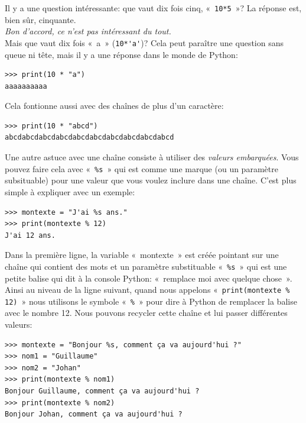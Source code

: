 Il y a une question intéressante: que vaut dix fois cinq, «~\verb+10*5+~»? La réponse est, bien sûr, cinquante.\\
  
  \emph{Bon d'accord, ce n'est pas intéressant du tout.}\\

Mais que vaut dix fois «~a~» (\verb+10*'a'+)? Cela peut paraître une question sans queue ni tête, mais il y a une réponse dans le monde de Python:

\begin{Verbatim}[frame=single,rulecolor=\color{mbleu}, label=à taper]
>>> print(10 * "a")
aaaaaaaaaa
\end{Verbatim}
Cela fontionne aussi avec des chaînes de plus d'un caractère:

\begin{Verbatim}[frame=single,rulecolor=\color{mbleu}, label=à taper]
>>> print(10 * "abcd")
abcdabcdabcdabcdabcdabcdabcdabcdabcdabcd
\end{Verbatim}

Une autre astuce avec une chaîne consiste à utiliser des \emph{valeurs embarquées}.\index{\%} 
Vous pouvez faire cela avec «~\texttt{\%s}~» qui est comme une marque (ou un paramètre subsituable) pour une valeur que vous voulez inclure dans une chaîne. C'est plus simple à expliquer avec un exemple: 

\begin{Verbatim}[frame=single,rulecolor=\color{mbleu}, label=à taper]
>>> montexte = "J'ai %s ans."
>>> print(montexte % 12)
J'ai 12 ans.
\end{Verbatim}

Dans la première ligne, la variable «~montexte~» est créée pointant sur une chaîne qui contient des mots et un paramètre substituable «~\texttt{\%s}~» qui est une petite balise qui dit à la console Python: «~remplace moi avec quelque chose~». Ainsi au niveau de la ligne suivant, quand nous appelons «~\texttt{print(montexte \% 12)}~» nous utilisons le symbole «~\texttt{\%}~» pour dire à Python de remplacer la balise avec le nombre 12.
Nous pouvons recycler cette chaîne et lui passer différentes valeurs:

\begin{Verbatim}[frame=single,rulecolor=\color{mbleu}, label=à taper]
>>> montexte = "Bonjour %s, comment ça va aujourd'hui ?"
>>> nom1 = "Guillaume"
>>> nom2 = "Johan"
>>> print(montexte % nom1)
Bonjour Guillaume, comment ça va aujourd'hui ?
>>> print(montexte % nom2)
Bonjour Johan, comment ça va aujourd'hui ?
\end{Verbatim}

